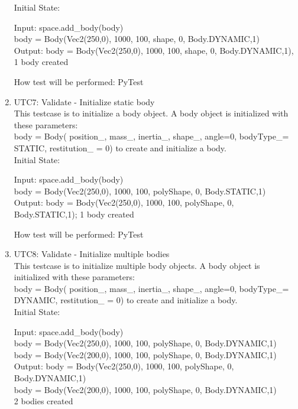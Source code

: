 \documentclass[12pt, titlepage]{article}
\begin{document}
\begin{enumerate}
Initial State: 

Input: space.add\_body(body)\\
body = Body(Vec2(250,0), 1000, 100, shape, 0, Body.DYNAMIC,1)\\

Output: body = Body(Vec2(250,0), 1000, 100, shape, 0, Body.DYNAMIC,1), 1 body created

How test will be performed: PyTest\\

\item{UTC7}{: Validate - Initialize static body\\}
This testcase is to initialize a body object.
A body object is initialized with these parameters:\\ 
body = Body( position\_, mass\_, inertia\_, shape\_, angle=0, bodyType\_= STATIC, restitution\_ = 0) to create and initialize a body.\\

Initial State: 

Input: space.add\_body(body)\\
body = Body(Vec2(250,0), 1000, 100, polyShape, 0, Body.STATIC,1)\\

Output: body = Body(Vec2(250,0), 1000, 100, polyShape, 0, Body.STATIC,1); 1 body created

How test will be performed: PyTest\\

\item{UTC8}{: Validate - Initialize multiple bodies\\}
This testcase is to initialize multiple body objects.
A body object is initialized with these parameters:\\ 
body = Body( position\_, mass\_, inertia\_, shape\_, angle=0, bodyType\_= DYNAMIC, restitution\_ = 0) to create and initialize a body.\\

Initial State: 

Input: space.add\_body(body)\\
body = Body(Vec2(250,0), 1000, 100, polyShape, 0, Body.DYNAMIC,1)\\
body = Body(Vec2(200,0), 1000, 100, polyShape, 0, Body.DYNAMIC,1)\\

Output: body = Body(Vec2(250,0), 1000, 100, polyShape, 0, Body.DYNAMIC,1)\\
        body = Body(Vec2(200,0), 1000, 100, polyShape, 0, Body.DYNAMIC,1)\\
        2 bodies created


\end{enumerate}
\end{document}
